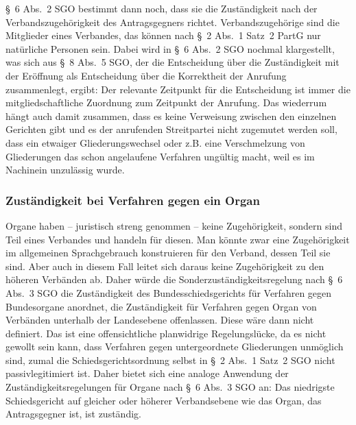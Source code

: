 \S~6 Abs.~2 SGO bestimmt dann noch, dass sie die Zuständigkeit nach der Verbandszugehörigkeit des Antragsgegners richtet.
Verbandszugehörige sind die Mitglieder eines Verbandes, das können nach \S~2 Abs.~1 Satz~2 PartG nur natürliche Personen sein.
Dabei wird in \S~6 Abs.~2 SGO nochmal klargestellt, was sich aus \S~8 Abs.~5 SGO, der die Entscheidung über die Zuständigkeit mit der Eröffnung als Entscheidung über die Korrektheit der Anrufung zusammenlegt, ergibt: Der relevante Zeitpunkt für die Entscheidung ist immer die mitgliedschaftliche Zuordnung zum Zeitpunkt der Anrufung.
Das wiederrum hängt auch damit zusammen, dass es keine Verweisung zwischen den einzelnen Gerichten gibt und es der anrufenden Streitpartei nicht zugemutet werden soll, dass ein etwaiger Gliederungswechsel oder z.B. eine Verschmelzung von Gliederungen das schon angelaufene Verfahren ungültig macht, weil es im Nachinein unzulässig wurde.

\subsubsection{Zuständigkeit bei Verfahren gegen ein Organ}
\label{Standardworkflow:Zustaendigkeit:Organ}
Organe haben -- juristisch streng genommen -- keine Zugehörigkeit, sondern sind Teil eines Verbandes und handeln für diesen.
Man könnte zwar eine Zugehörigkeit im allgemeinen Sprachgebrauch konstruieren für den Verband, dessen Teil sie sind.
Aber auch in diesem Fall leitet sich daraus keine Zugehörigkeit zu den höheren Verbänden ab.
Daher würde die Sonderzuständigkeitsregelung nach \S~6 Abs.~3 SGO die Zuständigkeit des Bundesschiedsgerichts für Verfahren gegen Bundesorgane anordnet, die Zuständigkeit für Verfahren gegen Organ von Verbänden unterhalb der Landesebene offenlassen.
Diese wäre dann nicht definiert. Das ist eine offensichtliche planwidrige Regelungslücke, da es nicht gewollt sein kann, dass Verfahren gegen untergeordnete Gliederungen unmöglich sind, zumal die Schiedsgerichtsordnung selbst in \S~2 Abs.~1 Satz~2 SGO nicht passivlegitimiert ist.
Daher bietet sich eine analoge Anwendung der Zuständigkeitsregelungen für Organe nach \S~6 Abs.~3 SGO an: Das niedrigste Schiedsgericht auf gleicher oder höherer Verbandsebene wie das Organ, das Antragsgegner ist, ist zuständig.

